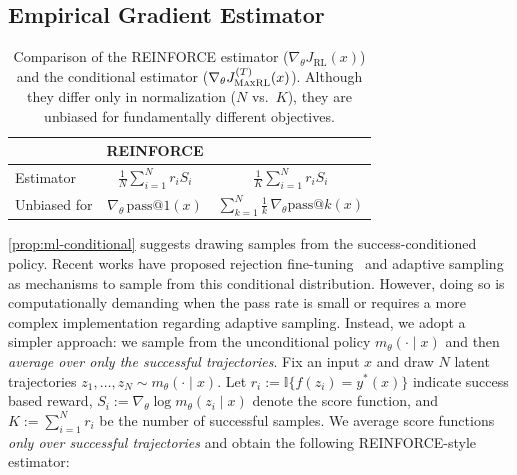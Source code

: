 \documentclass[10pt]{article} %
\begin{document}
\subsection{Empirical Gradient Estimator}
\label{sec:estimator_objective_equivalence}

\begin{table}
\vspace{-1.2em}
\centering
\caption{Comparison of the REINFORCE estimator
($\nabla_\theta J_{\mathrm{RL}}(x)$) and the conditional estimator
($\nabla_\theta J_{\mathrm{\textsc{MaxRL}}}^{(T)}(x)$).
Although they differ only in normalization ($N$ vs.\ $K$), they are unbiased for
fundamentally different objectives.}
\label{tab:reinforce-vs-conditional}
\vspace{0.3em}
\begin{tabular}{lcc}
\toprule
 & \textbf{REINFORCE} & \textbf{\ours{}} \\
\midrule
Estimator &
$
\frac{1}{N}\sum_{i=1}^N r_i S_i
$ &
$
\frac{1}{K}\sum_{i=1}^N r_i S_i
$ \\[0.5em]
Unbiased for &
$\nabla_\theta\,\mathrm{pass@}1(x)$ &
$
\sum_{k=1}^{N}\frac{1}{k}\,
\nabla_\theta \mathrm{pass@}k(x)
$ \\
\bottomrule
\end{tabular}
\vspace{-0.8em}
\end{table}
\cref{prop:ml-conditional} suggests drawing samples from the success-conditioned policy. Recent works have proposed rejection fine-tuning~\citep{touvron2023llama2openfoundation,yuan2023scalingrelationshiplearningmathematical,dong2023raftrewardrankedfinetuning,xiong2025minimalistapproachllmreasoning,davis2025objectivereasoningreinforcementlearning} and adaptive sampling~\citep{xiong2025reinforceadaadaptivesamplingframework} as mechanisms to sample from this conditional distribution. However, doing so is computationally demanding when the pass rate is small or requires a more complex implementation regarding adaptive sampling. Instead, we adopt a simpler approach: we sample from the unconditional policy $m_\theta(\cdot \mid x)$ and then \textit{average over only the successful trajectories}.
Fix an input $x$ and draw $N$ latent trajectories
$z_1,\ldots,z_N \sim m_\theta(\cdot \mid x)$. Let
$r_i := \mathbb{I}\{f(z_i)=y^\ast(x)\}$ indicate success based reward,
$S_i := \nabla_\theta \log m_\theta(z_i \mid x)$ denote the score function, and
$K := \sum_{i=1}^N r_i$ be the number of successful samples.
We average score functions \emph{only over successful trajectories} and obtain the following REINFORCE-style estimator:
\end{document}

